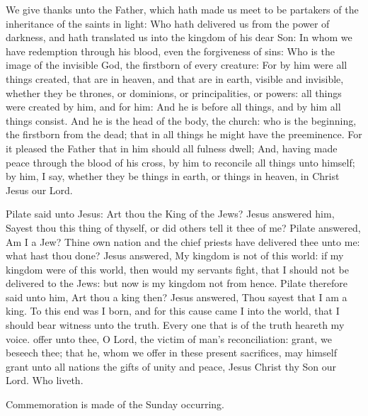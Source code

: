  We give thanks unto the Father, which hath made us meet to be partakers of the inheritance of the saints in light: Who hath delivered us from the power of darkness, and hath translated us into the kingdom of his dear Son: In whom we have redemption through his blood, even the forgiveness of sins: Who is the image of the invisible God, the firstborn of every creature: For by him were all things created, that are in heaven, and that are in earth, visible and invisible, whether they be thrones, or dominions, or principalities, or powers: all things were created by him, and for him: And he is before all things, and by him all things consist. And he is the head of the body, the church: who is the beginning, the firstborn from the dead; that in all things he might have the preeminence. For it pleased the Father that in him should all fulness dwell; And, having made peace through the blood of his cross, by him to reconcile all things unto himself; by him, I say, whether they be things in earth, or things in heaven, %
in Christ Jesus our Lord.



 Pilate said unto Jesus: Art thou the King of the Jews? Jesus answered him, Sayest thou this thing of thyself, or did others tell it thee of me? Pilate answered, Am I a Jew? Thine own nation and the chief priests have delivered thee unto me: what hast thou done? Jesus answered, My kingdom is not of this world: if my kingdom were of this world, then would my servants fight, that I should not be delivered to the Jews: but now is my kingdom not from hence. Pilate therefore said unto him, Art thou a king then? Jesus answered, Thou sayest that I am a king. To this end was I born, and for this cause came I into the world, that I should bear witness unto the truth. Every one that is of the truth heareth my voice.
\secret
{} offer unto thee, O Lord, the victim of man's reconciliation: grant, we beseech thee; that he, whom we offer in these present sacrifices, may himself grant unto all nations the gifts of unity and peace, Jesus Christ thy Son our Lord. Who liveth.
\begin{rubric}
    Commemoration is made of the Sunday occurring.
\end{rubric}

